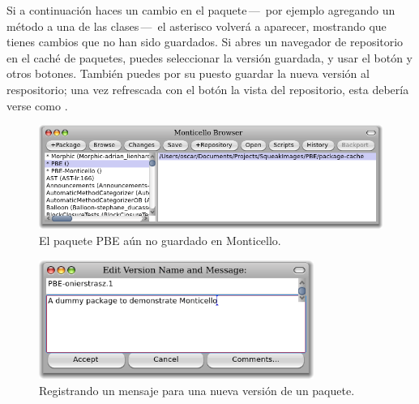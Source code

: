 \documentclass[spanish,a4paper,10pt,twoside]{book}
\begin{document}
Si a continuaci\'on haces un cambio en el paquete\,---\, por ejemplo agregando un m\'etodo a una de las clases\,---\, el asterisco volver\'a a aparecer, mostrando que tienes cambios que no han sido guardados.  Si abres un navegador de repositorio en el cach\'e de paquetes, puedes seleccionar la versi\'on guardada, y usar el bot\'on  y otros botones.
Tambi\'en puedes por su puesto guardar la nueva versi\'on al respositorio; una vez refrescada con el bot\'on  la vista del repositorio, esta deber\'ia verse como .

\begin{figure}[tbp]
	\begin{center}
		\includegraphics[width=\textwidth]{MC+PBE}
	\end{center}
	\caption{El paquete PBE a\'un no guardado en Monticello.}
\end{figure}

\begin{figure}[tbp]
	\begin{center}
	\includegraphics[width=0.8\textwidth]{PBE-on}
	\end{center}
	\caption{Registrando un mensaje para una nueva versi\'on de un paquete.}
\end{figure}
\end{document}
